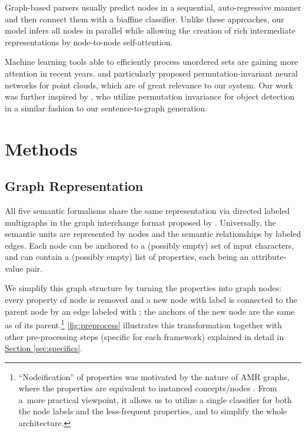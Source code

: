 \documentclass[11pt,a4paper]{article}
\newcommand{\secref}[1]{\hyperref[#1]{Section \ref*{#1}}}
\begin{document}
Graph-based parsers \cite{mcdonald2006online, peng2017addressing, dozat2018simpler, cai-lam-2020-amr} usually predict nodes in a sequential, auto-regressive manner and then connect them with a biaffine classifier. Unlike these approaches, our model infers all nodes in parallel while allowing the creation of rich intermediate representations by node-to-node self-attention.

Machine learning tools able to efficiently process unordered sets are gaining more attention in recent years. \citet{qi2017pointnet} and particularly \citet{zhang2019deep} proposed permutation-invariant neural networks for point clouds, which are of great relevance to our system. Our work was further inspired by \citet{carion2020end}, who utilize permutation invariance for object detection in a similar fashion to our sentence-to-graph generation. \section{Methods}

\subsection{Graph Representation}
\label{sec:representation}

All five semantic formalisms share the same representation via directed labeled multigraphs in the graph interchange format proposed by \citet{kuhlmann2016towards}. Universally, the semantic units are represented by nodes and the semantic relationships by labeled edges. Each node can be anchored to a (possibly empty) set of input characters, and can contain a (possibly empty) list of properties, each being an attribute-value pair.

We simplify this graph structure by turning the properties into graph nodes: every property  of node  is removed and a new node with label  is connected to the parent node  by an edge labeled with ; the anchors of the new node are the same as of its parent.\hspace{-.08em}\footnote{``Nodeification'' of properties was motivated by the nature of AMR graphs, where the properties are equivalent to instanced concepts/nodes \cite{banarescu2013abstract}. From a~more practical viewpoint, it allows us to utilize a single classifier for both the node labels and the less-frequent properties, and to simplify the whole architecture.}  \autoref{fig:preprocess} illustrates this transformation together with other pre-processing steps (specific for each framework) explained in detail in \secref{sec:specifics}.
\end{document}
